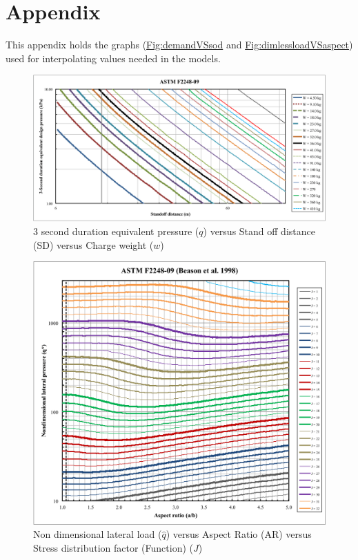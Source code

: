 \documentclass[12pt]{article}
\begin{document}
\section{Appendix}
\label{Sec:Appendix}
This appendix holds the graphs (\hyperref[Figure:demandVSsod]{Fig:demandVSsod} and \hyperref[Figure:dimlessloadVSaspect]{Fig:dimlessloadVSaspect}) used for interpolating values needed in the models.

\begin{figure}
\begin{center}
\includegraphics[width=\textwidth]{../../../datafiles/GlassBR/ASTM_F2248-09.png}
\caption{3 second duration equivalent pressure ($q$) versus Stand off distance (SD) versus Charge weight ($w$)}
\label{Figure:demandVSsod}
\end{center}
\end{figure}
\begin{figure}
\begin{center}
\includegraphics[width=\textwidth]{../../../datafiles/GlassBR/ASTM_F2248-09_BeasonEtAl.png}
\caption{Non dimensional lateral load ($\hat{q}$) versus Aspect Ratio (AR) versus Stress distribution factor (Function) ($J$)}
\label{Figure:dimlessloadVSaspect}
\end{center}
\end{figure}
\end{document}
